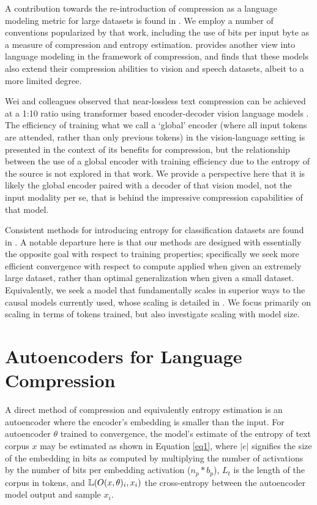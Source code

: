 \documentclass{article}
\begin{document}
    A contribution towards the re-introduction of compression as a language modeling metric for large datasets is found in \citep{gao2020pile800gbdatasetdiverse}. We employ a number of conventions popularized by that work, including the use of bits per input byte as a measure of compression and entropy estimation. \citep{delétang2024languagemodelingcompression} provides another view into language modeling in the framework of compression, and finds that these models also extend their compression abilities to vision and speech datasets, albeit to a more limited degree. 

    Wei and colleagues observed that near-lossless text compression can be achieved at a 1:10 ratio using transformer based encoder-decoder vision language models \citep{wei2025deepseekocrcontextsopticalcompression}.  The efficiency of training what we call a `global' encoder (where all input tokens are attended, rather than only previous tokens) in the vision-language setting is presented in the context of its benefits for compression, but the relationship between the use of a global encoder with training efficiency due to the entropy of the source is not explored in that work. We provide a perspective here that it is likely the global encoder paired with a decoder of that vision model, not the input modality per se, that is behind the impressive compression capabilities of that model.
    
    Consistent methods for introducing entropy for classification datasets are found in \citep{shalev2020neuraljointentropyestimation}. A notable departure here is that our methods are designed with essentially the opposite goal with respect to training properties; specifically we seek more efficient convergence with respect to compute applied when given an extremely large dataset, rather than optimal generalization when given a small dataset. Equivalently, we seek a model that fundamentally scales in superior ways to the causal models currently used, whose scaling is detailed in \citep{hoffmann2022trainingcomputeoptimallargelanguage}. We focus primarily on scaling in terms of tokens trained, but also investigate scaling with model size.

\section{Autoencoders for Language Compression} \label{autosection}

    A direct method of compression and equivalently entropy estimation is an autoencoder where the encoder's embedding is smaller than the input. For autoencoder $\theta$ trained to convergence, the model's estimate of the entropy of text corpus $x$ may be estimated as shown in Equation \ref{eq1}, where $|e|$ signifies the size of the embedding in bits as computed by multiplying the number of activations by the number of bits per embedding activation ($n_p*b_p$), $L_t$ is the length of the corpus in tokens, and $\Bbb L(O(x, \theta)_i, x_i)$ the cross-entropy between the autoencoder model output and sample $x_i$.
\end{document}
